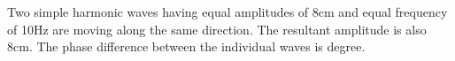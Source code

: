 \item Two simple harmonic waves having equal amplitudes of 8cm and equal frequency of 10Hz are moving along the same direction. The resultant amplitude is also 8cm. The phase difference between the individual waves is \underline{\hspace{2.5cm}} degree.
